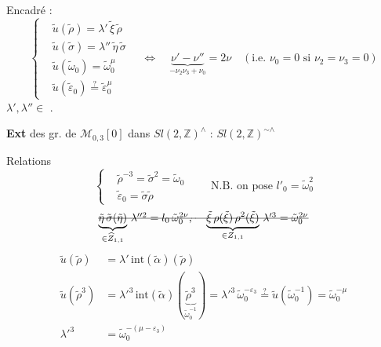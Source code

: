 \documentclass[11pt,a4paper]{article}
\begin{document}
Encadré :
\[
\left\{
\begin{aligned}
&\tilde u(\tilde\rho) = \lambda'\,\tilde\xi\,\tilde\rho \\
&\tilde u(\tilde\sigma) = \lambda''\,\tilde\eta\,\tilde\sigma \\
&\tilde u(\tilde\omega_0) = \tilde\omega_0^{\mu} \\
&\tilde u(\tilde\varepsilon_0) \overset{?}{=} \tilde\varepsilon_0^{\mu}
\end{aligned}
\right.
\quad\Longleftrightarrow\quad
\underbrace{\nu' - \nu''}_{-\nu_2\nu_3 + \nu_0} = 2\nu
\quad (\text{i.e. } \nu_0 = 0 \text{ si } \nu_2 = \nu_3 = 0)
\]
$\lambda', \lambda'' \in$ .

\textbf{Ext} des gr. de $\mathcal{M}_{0,3}[0]$ dans $Sl(2, \mathbb{Z})^{\wedge}$ : $Sl(2, \mathbb{Z})^{\sim\wedge}$

Relations
\[
\left\{
\begin{aligned}
&\tilde\rho^{-3} = \tilde\sigma^2 = \tilde\omega_0 \\
&\tilde\varepsilon_0 = \tilde\sigma\tilde\rho
\end{aligned}
\right.
\qquad \text{N.B. on pose } l'_0 = \tilde\omega_0^2
\]
\[
\text{\struck{$\underbrace{\tilde\eta\,\tilde\sigma(\tilde\eta)}_{\in \widehat{Z}_{1,1}}\,\lambda''^2 = l_0\,\tilde\omega_0^{2\nu}$,
\quad $\underbrace{\tilde\xi\,\rho(\tilde\xi)\,\rho^2(\tilde\xi)}_{\in Z_{1,1}}\,\lambda'^3 = \tilde\omega_0^{2\nu}$}}
\]
\[
\begin{aligned}
\tilde u(\tilde\rho) &= \lambda'\,\mathrm{int}(\tilde\alpha)(\tilde\rho) \\
\tilde u(\tilde\rho^3) &= \lambda'^3\,\mathrm{int}(\tilde\alpha)(\underbrace{\tilde\rho^3}_{\tilde\omega_0^{-1}})
= \lambda'^3\,\tilde\omega_0^{-\varepsilon_3} \overset{?}{=} \tilde u(\tilde\omega_0^{-1}) = \tilde\omega_0^{-\mu} \\
\lambda'^3 &= \tilde\omega_0^{-(\mu - \varepsilon_3)}
\end{aligned}
\]
\end{document}
